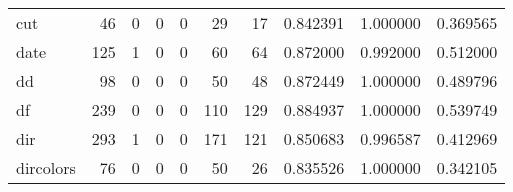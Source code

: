 \begin{tabular}{lrrrrrrrrr}
cut       &                                        46 &                                                  0 &                                                  0 &                                                  0 &                                                 29 &                                                 17 &                                           0.842391 &                               1.000000 &                             0.369565 \\
date      &                                       125 &                                                  1 &                                                  0 &                                                  0 &                                                 60 &                                                 64 &                                           0.872000 &                               0.992000 &                             0.512000 \\
dd        &                                        98 &                                                  0 &                                                  0 &                                                  0 &                                                 50 &                                                 48 &                                           0.872449 &                               1.000000 &                             0.489796 \\
df        &                                       239 &                                                  0 &                                                  0 &                                                  0 &                                                110 &                                                129 &                                           0.884937 &                               1.000000 &                             0.539749 \\
dir       &                                       293 &                                                  1 &                                                  0 &                                                  0 &                                                171 &                                                121 &                                           0.850683 &                               0.996587 &                             0.412969 \\
dircolors &                                        76 &                                                  0 &                                                  0 &                                                  0 &                                                 50 &                                                 26 &                                           0.835526 &                               1.000000 &                             0.342105 \\

\end{tabular}
